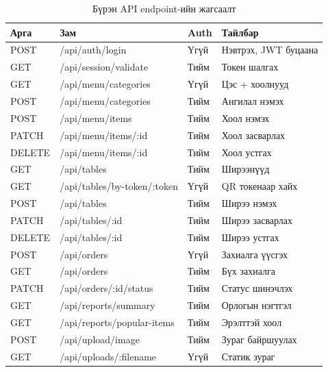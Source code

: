 \documentclass[12pt,a4paper]{article}
\begin{document}
\begin{table}[H]
\caption{Бүрэн API endpoint-ийн жагсаалт}
\label{tab:fullapi}
\centering
\begin{tabularx}{\textwidth}{@{}p{1.2cm}p{4.2cm}p{1.5cm}p{3.8cm}@{}}
\toprule
\textbf{Арга} & \textbf{Зам} & \textbf{Auth} & \textbf{Тайлбар} \\
\midrule
POST & /api/auth/login               & Үгүй & Нэвтрэх, JWT буцаана \\
GET  & /api/session/validate         & Тийм & Токен шалгах \\
\midrule
GET  & /api/menu/categories          & Үгүй & Цэс + хоолнууд \\
POST & /api/menu/categories          & Тийм & Ангилал нэмэх \\
POST & /api/menu/items               & Тийм & Хоол нэмэх \\
PATCH& /api/menu/items/:id           & Тийм & Хоол засварлах \\
DELETE& /api/menu/items/:id          & Тийм & Хоол устгах \\
\midrule
GET  & /api/tables                   & Тийм & Ширээнүүд \\
GET  & /api/tables/by-token/:token   & Үгүй & QR токенаар хайх \\
POST & /api/tables                   & Тийм & Ширээ нэмэх \\
PATCH& /api/tables/:id               & Тийм & Ширээ засварлах \\
DELETE& /api/tables/:id              & Тийм & Ширээ устгах \\
\midrule
POST & /api/orders                   & Үгүй & Захиалга үүсгэх \\
GET  & /api/orders                   & Тийм & Бүх захиалга \\
PATCH& /api/orders/:id/status        & Тийм & Статус шинэчлэх \\
\midrule
GET  & /api/reports/summary          & Тийм & Орлогын нэгтгэл \\
GET  & /api/reports/popular-items    & Тийм & Эрэлттэй хоол \\
\midrule
POST & /api/upload/image             & Тийм & Зураг байршуулах \\
GET  & /api/uploads/:filename        & Үгүй & Статик зураг \\
\bottomrule
\end{tabularx}
\end{table}

\end{document}
